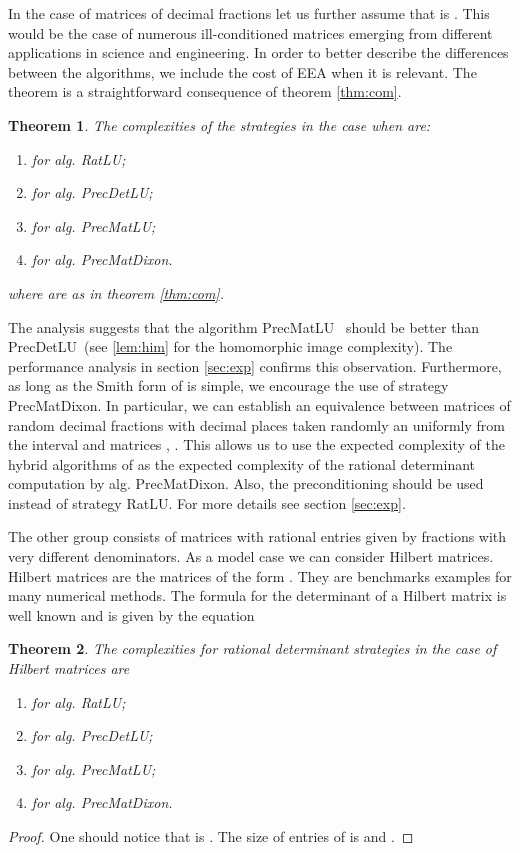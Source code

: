 \documentclass{acm_proc_article-sp}   \usepackage{graphicx,url}
\newcommand{\algrdRat}{RatLU}
\newcommand{\algrdDet}{PrecDetLU}
\newcommand{\algrdMat}{PrecMatLU}
\newcommand{\algrdDixon}{PrecMatDixon}
\newtheorem{theorem}{Theorem}[section]
\begin{document}
In the case of matrices of decimal fractions let us further assume that  is . This would be the case of numerous ill-conditioned matrices emerging from different applications in science and engineering. In order to better describe the differences between the algorithms, we include the cost of EEA when it is relevant. The theorem is a straightforward consequence of theorem \ref{thm:com}.
\begin{theorem}
The complexities of the strategies in the case when  are:
\begin{enumerate}
\item 
    for alg. \algrdRat;
\item 
for alg. \algrdDet;
\item 
for alg. \algrdMat;
\item 
    for alg. \algrdDixon.
\end{enumerate}
where  are as in theorem \ref{thm:com}.
\end{theorem}
The analysis suggests that the algorithm \algrdMat~ should be better than
\algrdDet~\-(see \ref{lem:him} for the homomorphic image
complexity). The performance analysis in section \ref{sec:exp}
confirms this observation. Furthermore, as long as the Smith form of
 is simple, we encourage the use of strategy \algrdDixon.
In particular, we can establish an equivalence between matrices 
of random decimal fractions with  decimal places taken randomly
an uniformly from the interval  and matrices ,
. This allows us to use the expected
complexity of the hybrid algorithms of \cite{jgd:2006:det} as the
expected complexity of the rational determinant computation by alg.
\algrdDixon.
Also,
the preconditioning should be used instead of strategy \algrdRat. For more details see section \ref{sec:exp}.

The other group consists of matrices with rational entries given by
fractions with very different denominators. As a model case we can
consider Hilbert matrices. Hilbert matrices are the matrices of the
form . They are benchmarks examples for
many numerical methods. The formula for the determinant of a Hilbert matrix is
well known and is given by the equation




\begin{theorem}\label{thm:hil}
The complexities for rational determinant strategies in the case of Hilbert matrices are
\begin{enumerate}
\item 
    for alg. \algrdRat;
\item 
for alg. \algrdDet;
\item 
for alg. \algrdMat;
\item 
    for alg. \algrdDixon.
\end{enumerate}
\end{theorem}
\begin{proof}
One should notice that  is . The size of entries of  is  and .
\end{proof}
\end{document}
